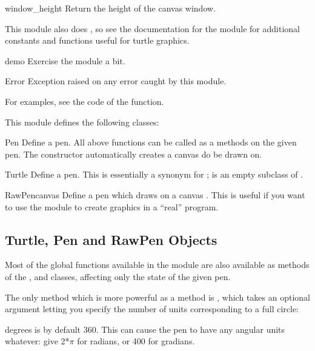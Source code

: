 \begin{funcdesc}{window\_height}{}
Return the height of the canvas window.
\end{funcdesc}

This module also does , so see the
documentation for the  module for additional constants
and functions useful for turtle graphics.

\begin{funcdesc}{demo}{}
Exercise the module a bit.
\end{funcdesc}

\begin{excdesc}{Error}
Exception raised on any error caught by this module.
\end{excdesc}

For examples, see the code of the  function.

This module defines the following classes:

\begin{classdesc}{Pen}{}
Define a pen. All above functions can be called as a methods on the given
pen. The constructor automatically creates a canvas do be drawn on.
\end{classdesc}

\begin{classdesc}{Turtle}{}
Define a pen. This is essentially a synonym for ;
 is an empty subclass of .
\end{classdesc}

\begin{classdesc}{RawPen}{canvas}
Define a pen which draws on a canvas . This is useful if 
you want to use the module to create graphics in a ``real'' program.
\end{classdesc}

\subsection{Turtle, Pen and RawPen Objects \label{pen-rawpen-objects}}

Most of the global functions available in the module are also
available as methods of the ,  and
 classes, affecting only the state of the given pen.

The only method which is more powerful as a method is
, which takes an optional argument letting 
you specify the number of units corresponding to a full circle:

\begin{methoddesc}{degrees}{}
 is by default 360. This can cause the pen to have any
angular units whatever: give  2*$\pi$ for radians, or
400 for gradians.
\end{methoddesc}
